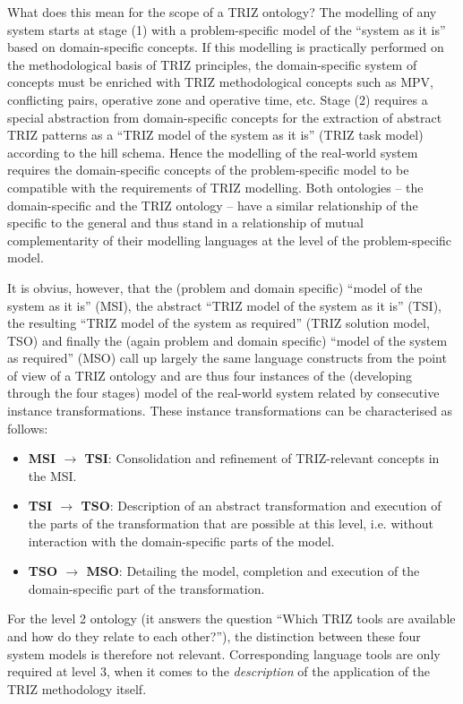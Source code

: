 \documentclass[12pt,a4paper]{article}
\begin{document}
What does this mean for the scope of a TRIZ ontology? The modelling of any
system starts at stage (1) with a problem-specific model of the “system as it
is” based on domain-specific concepts. If this modelling is practically
performed on the methodological basis of TRIZ principles, the domain-specific
system of concepts must be enriched with TRIZ methodological concepts such as
MPV, conflicting pairs, operative zone and operative time, etc. Stage (2)
requires a special abstraction from domain-specific concepts for the
extraction of abstract TRIZ patterns as a “TRIZ model of the system as it is”
(TRIZ task model) according to the hill schema. Hence the modelling of the
real-world system requires the domain-specific concepts of the
problem-specific model to be compatible with the requirements of TRIZ
modelling. Both ontologies – the domain-specific and the TRIZ ontology – have
a similar relationship of the specific to the general and thus stand in a
relationship of mutual complementarity of their modelling languages at the
level of the problem-specific model.

It is obvius, however, that the (problem and domain specific) “model of the
system as it is” (MSI), the abstract “TRIZ model of the system as it is”
(TSI), the resulting “TRIZ model of the system as required” (TRIZ solution
model, TSO) and finally the (again problem and domain specific) “model of the
system as required” (MSO) call up largely the same language constructs from
the point of view of a TRIZ ontology and are thus four instances of the
(developing through the four stages) model of the real-world system related by
consecutive instance transformations. These instance transformations can be
characterised as follows:
\begin{itemize}
\item \textbf{MSI $\to$ TSI}: Consolidation and refinement of TRIZ-relevant
  concepts in the MSI.
\item \textbf{TSI $\to$ TSO}: Description of an abstract transformation and
  execution of the parts of the transformation that are possible at this
  level, i.e. without interaction with the domain-specific parts of the model.
\item \textbf{TSO $\to$ MSO}: Detailing the model, completion and execution of the
  domain-specific part of the transformation.
\end{itemize}
For the level 2 ontology (it answers the question “Which TRIZ tools are
available and how do they relate to each other?”), the distinction between
these four system models is therefore not relevant. Corresponding language
tools are only required at level 3, when it comes to the \emph{description} of
the application of the TRIZ methodology itself.
\end{document}
